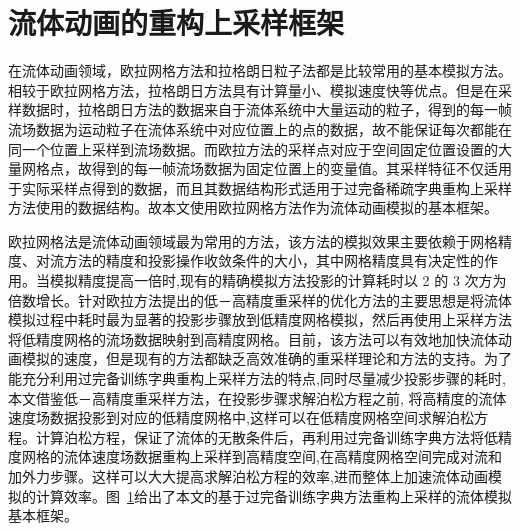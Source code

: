 \section{流体动画的重构上采样框架}

在流体动画领域，欧拉网格方法和拉格朗日粒子法都是比较常用的基本模拟方法。相较于欧拉网格方法，拉格朗日方法具有计算量小、模拟速度快等优点。但是在采样数据时，拉格朗日方法的数据来自于流体系统中大量运动的粒子，得到的每一帧流场数据为运动粒子在流体系统中对应位置上的点的数据，故不能保证每次都能在同一个位置上采样到流场数据。而欧拉方法的采样点对应于空间固定位置设置的大量网格点，故得到的每一帧流场数据为固定位置上的变量值。其采样特征不仅适用于实际采样点得到的数据，而且其数据结构形式适用于过完备稀疏字典重构上采样方法使用的数据结构。故本文使用欧拉网格方法作为流体动画模拟的基本框架。

欧拉网格法是流体动画领域最为常用的方法，该方法的模拟效果主要依赖于网格精度、对流方法的精度和投影操作收敛条件的大小，其中网格精度具有决定性的作用。当模拟精度提高一倍时,现有的精确模拟方法投影的计算耗时以 2 的 3 次方为倍数增长。针对欧拉方法提出的低－高精度重采样的优化方法的主要思想是将流体模拟过程中耗时最为显著的投影步骤放到低精度网格模拟，然后再使用上采样方法将低精度网格的流场数据映射到高精度网格。目前，该方法可以有效地加快流体动画模拟的速度，但是现有的方法都缺乏高效准确的重采样理论和方法的支持。为了能充分利用过完备训练字典重构上采样方法的特点,同时尽量减少投影步骤的耗时,本文借鉴低－高精度重采样方法，在投影步骤求解泊松方程之前, 将高精度的流体速度场数据投影到对应的低精度网格中,这样可以在低精度网格空间求解泊松方程。计算泊松方程，保证了流体的无散条件后，再利用过完备训练字典方法将低精度网格的流体速度场数据重构上采样到高精度空间,在高精度网格空间完成对流和加外力步骤。这样可以大大提高求解泊松方程的效率,进而整体上加速流体动画模拟的计算效率。图~\ref{simulationframework}给出了本文的基于过完备训练字典方法重构上采样的流体模拟基本框架。

\begin{figure}[ht]
  \centering
\label {simulationframework}
\end{figure}

